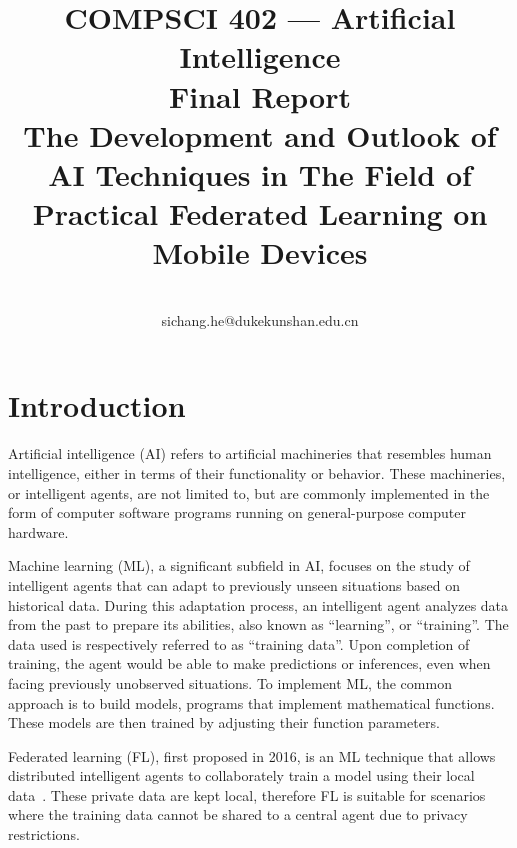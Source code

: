 \documentclass[conference]{IEEEtran}
\begin{document}
\title{
    COMPSCI 402 --- Artificial Intelligence\\
    Final Report\\
    The Development and Outlook of AI Techniques in The Field of
    Practical Federated Learning on Mobile Devices
}

\author{
    \\
    sichang.he@dukekunshan.edu.cn
}

\maketitle

\begin{abstract}
\end{abstract}

\section{Introduction}


Artificial intelligence (AI) refers to
artificial machineries that resembles human intelligence,
either in terms of their functionality or behavior.
These machineries, or intelligent agents,
are not limited to,
but are commonly implemented in the form of computer software programs
running on general-purpose computer hardware.

Machine learning (ML), a significant subfield in AI,
focuses on the study of intelligent agents that can
adapt to previously unseen situations based on historical data.
During this adaptation process,
an intelligent agent analyzes data from the past to
prepare its abilities,
also known as ``learning'', or ``training''.
The data used is respectively referred to as ``training data''.
Upon completion of training,
the agent would be able to make predictions or inferences,
even when facing previously unobserved situations.
To implement ML, the common approach is to build models,
programs that implement mathematical functions.
These models are then trained by adjusting their function parameters.


Federated learning (FL), first proposed in 2016, is an ML technique that
allows distributed intelligent agents to collaborately train a model using
their local data~\cite{mcmahan2017communication,yang2019federated}.
These private data are kept local,
therefore FL is suitable for scenarios where
the training data cannot be shared to a central agent due to
privacy restrictions.
\end{document}
